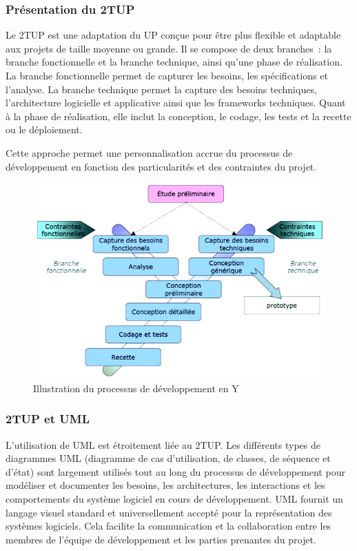 \subsubsection{Présentation du 2TUP}
Le 2TUP est une adaptation du UP conçue pour être plus flexible et adaptable aux
projets de taille moyenne ou grande. Il se compose de deux branches : la branche
fonctionnelle et la branche technique, ainsi qu’une phase de réalisation.
La branche fonctionnelle permet de capturer les besoins, les spécifications et
l’analyse. La branche technique permet la capture des besoins techniques, l’architecture
logicielle et applicative ainsi que les frameworks techniques. Quant à la phase
de réalisation, elle inclut la conception, le codage, les tests et la recette
ou le déploiement.

Cette approche permet une personnalisation accrue du processus de développement en
fonction des particularités et des contraintes du projet.

\newpage
\begin{figure}[H]
  \includegraphics{./figure/illustrationDeveloppementEnY.png}
  \caption{Illustration du processus de développement en Y}
\end{figure}



\subsubsection{2TUP et UML}
L’utilisation de UML est étroitement liée au 2TUP. Les différents types de
diagrammes UML (diagramme de cas d’utilisation, de classes, de séquence et d’état)
sont largement utilisés tout au long du processus de développement pour modéliser
et documenter les besoins, les architectures, les interactions et les comportements
du système logiciel en cours de développement. UML fournit un langage visuel
standard et universellement accepté pour la représentation des systèmes logiciels.
Cela facilite la communication et la collaboration entre les membres de l’équipe
de développement et les
parties prenantes du projet.


